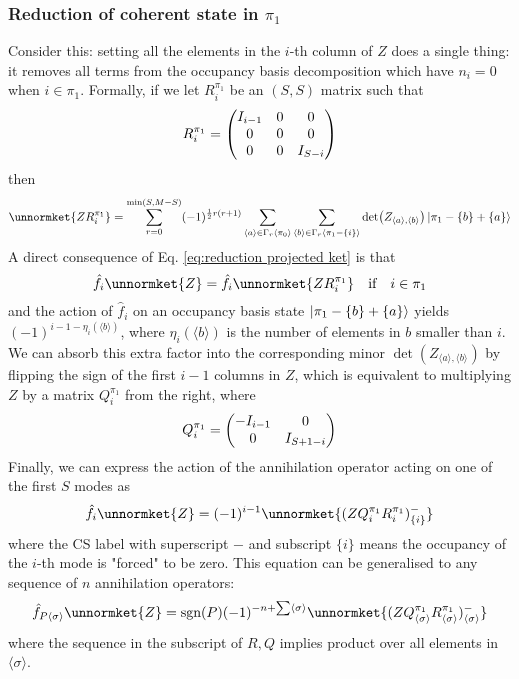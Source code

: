 \documentclass[12pt]{article}
\newcommand{\sgn}{\text{sgn}}
\newcommand{\seq}[1]{\langle #1\rangle}
\begin{document}
	\subsubsection{Reduction of coherent state in $\pi_1$} \label{sec: reduction in pi 1}
	Consider this: setting all the elements in the $i$-th column of $Z$ does a single thing: it removes all terms from the occupancy basis decomposition which have $n_i=0$ when $i\in\pi_1$. Formally, if we let $R^{\pi_1}_i$ be an $(S,S)$ matrix such that
	\begin{equation}\label{eq:reduction projection}
	R^{\pi_1}_i=\mqty(\dmat[0]{I_{i-1}, 0, I_{S-i}})
	\end{equation}
	then
	\begin{equation} \label{eq:reduction projected ket}
	\unnormket{ZR^{\pi_1}_i}=\sum_{r=0}^{\min(S,M-S)}(-1)^{\frac{1}{2}r(r+1)}\sum_{\seq{a}\in\Gamma_r\seq{\pi_0}}\sum_{\seq{b}\in\Gamma_r\seq{\pi_1-\{i\}}}\det(Z_{\seq{a},\seq{b}})\ket{\pi_1-\{b\}+\{a\}}
	\end{equation}
	A direct consequence of Eq. \ref{eq:reduction projected ket} is that
	\begin{equation}
	\hat{f}_i\unnormket{Z}=\hat{f}_i\unnormket{ZR^{\pi_1}_i}\qq{if}i\in\pi_1
	\end{equation}
	and the action of $\hat{f}_i$ on an occupancy basis state $\ket{\pi_1-\{b\}+\{a\}}$ yields $(-1)^{i-1-\eta_i(\seq{b})}$, where $\eta_i(\seq{b})$ is the number of elements in $b$ smaller than $i$. We can absorb this extra factor into the corresponding minor $\det(Z_{\seq{a},\seq{b}})$ by flipping the sign of the first $i-1$ columns in $Z$, which is equivalent to multiplying $Z$ by a matrix $Q^{\pi_1}_i$ from the right, where
	\begin{equation}
	Q^{\pi_1}_i = \mqty(\dmat[0]{-I_{i-1},I_{S+1-i}})
	\end{equation}
	Finally, we can express the action of the annihilation operator acting on one of the first $S$ modes as
	\begin{equation}
	\hat{f}_i\unnormket{Z}=(-1)^{i-1}\unnormket{(ZQ^{\pi_1}_iR^{\pi_1}_i)^-_{\{i\}}}
	\end{equation}
	where the CS label with superscript $-$ and subscript $\{i\}$ means the occupancy of the $i$-th mode is "forced" to be zero. This equation can be generalised to any sequence of $n$ annihilation operators:
	\begin{equation}
	\hat{f}_{P\seq{\sigma}}\unnormket{Z}=\sgn(P)(-1)^{-n+\sum\seq{\sigma}}\unnormket{(ZQ^{\pi_1}_{\seq{\sigma}}R^{\pi_1}_{\seq{\sigma}})^{-}_{\seq{\sigma}}}
	\end{equation}
	where the sequence in the subscript of $R, Q$ implies product over all elements in $\seq{\sigma}$.
	
\end{document}
